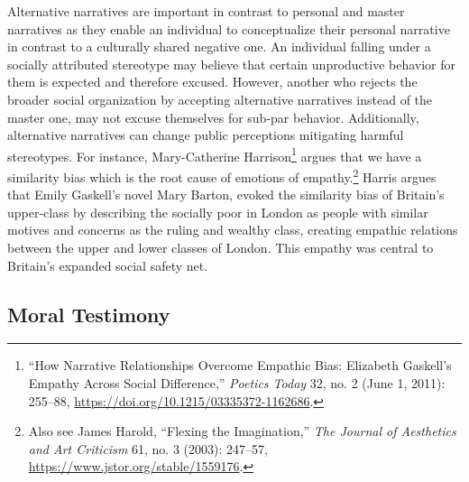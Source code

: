 \documentclass[phdthesis,12pt,final]{wuthesis}
\theoremstyle{definition}
\theoremstyle{definition}
\theoremstyle{definition}
\theoremstyle{definition}
\theoremstyle{remark}
\begin{document}
Alternative narratives are important in contrast to personal and master narratives as they enable an individual to conceptualize their personal narrative in contrast to a culturally shared negative one. An individual falling under a socially attributed stereotype may believe that certain unproductive behavior for them is expected and therefore excused. However, another who rejects the broader social organization by accepting alternative narratives instead of the master one, may not excuse themselves for sub-par behavior. Additionally, alternative narratives can change public perceptions mitigating harmful stereotypes. For instance, Mary-Catherine Harrison\footnote{{``How {Narrative Relationships Overcome Empathic Bias}: {Elizabeth Gaskell}'s {Empathy} Across {Social Difference},''} \emph{Poetics Today} 32, no. 2 (June 1, 2011): 255--88, \url{https://doi.org/10.1215/03335372-1162686}.} argues that we have a similarity bias which is the root cause of emotions of empathy.\footnote{Also see James Harold, {``Flexing the {Imagination},''} \emph{The Journal of Aesthetics and Art Criticism} 61, no. 3 (2003): 247--57, \url{https://www.jstor.org/stable/1559176}.} Harris argues that Emily Gaskell's novel Mary Barton, evoked the similarity bias of Britain's upper-class by describing the socially poor in London as people with similar motives and concerns as the ruling and wealthy class, creating empathic relations between the upper and lower classes of London. This empathy was central to Britain's expanded social safety net.

\subsection*{Moral Testimony}\label{moral-testimony}
\end{document}
